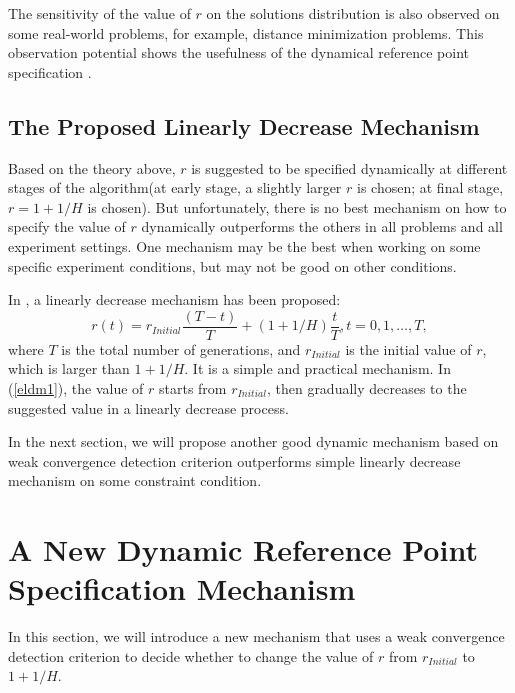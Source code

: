 \documentclass[conference]{IEEEtran}
\begin{document}
The sensitivity of the value of $r$ on the solutions distribution is also observed on some real-world problems,
for example, distance minimization problems. 
This observation potential shows the usefulness of the dynamical reference point specification
\cite{hisao:dynamic}.

% 
\subsection{The Proposed Linearly Decrease Mechanism}
Based on the theory above, $r$ is suggested to be specified dynamically at different stages of
the algorithm(at early stage, a slightly larger $r$ is chosen; at final stage, $r=1+1/H$ is chosen).
But unfortunately, there is no best mechanism on how to specify the value of $r$ dynamically
outperforms the others in all problems and all experiment settings. One mechanism may be the best
when working on some specific experiment conditions, but may not be good on other conditions. 

In \cite{hisao:dynamic}, a linearly decrease mechanism has been proposed:
\begin{equation}\label{eldm1}
  r(t)=r_{Initial}\frac{(T-t)}{T}+(1+1/H)\frac{t}{T}, t=0,1,\dots,T,
\end{equation}
where $T$ is the total number of generations, and $r_{Initial}$ is the initial value of $r$,
which is larger than $1+1/H$.
It is a simple and practical mechanism. In (\ref{eldm1}), the value of $r$ starts from $r_{Initial}$,
then gradually decreases to the suggested value in a linearly decrease process. 

In the next section, we will propose another good dynamic mechanism based on weak convergence 
detection criterion outperforms simple linearly decrease mechanism on some constraint condition.

% 
\section{A New Dynamic Reference Point Specification Mechanism}
In this section,
we will introduce a new mechanism that uses a weak convergence detection criterion to 
decide whether to change the value of $r$ from $r_{Initial}$ to $1+1/H$. 
\end{document}
